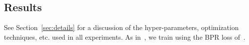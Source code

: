 \subsection{Results\label{sec:results}}


See Section~\ref{sec:details} for a discussion of the hyper-parameters, optimization techniques, etc. used in all experiments. As in~\citet{limin}, we train using the BPR loss of~\citet{rendle2009bpr}. 






